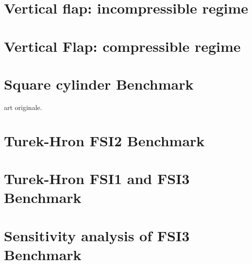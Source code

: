 \section{Vertical flap: incompressible regime}

\section{Vertical Flap: compressible regime}


\section{Square cylinder Benchmark}


\cite{ramm1998fluid} art originale.
\cite{walhorn2002space}
\cite{matthies2003partitioned}
\cite{dettmer2006computational}
\cite{olivier2009fluid}
\cite{wood2010partitioned}
\cite{kassiotis2011nonlinear}
\cite{habchi2013partitioned}
\cite{froehle2014high}


\section{Turek-Hron FSI2 Benchmark}



\section{Turek-Hron FSI1 and FSI3 Benchmark}


\section{Sensitivity analysis of FSI3 Benchmark}




